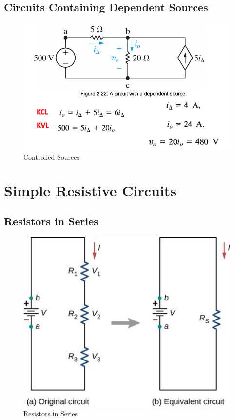 \documentclass[14pt]{memoir}
\begin{document}
\section{Circuits Containing Dependent Sources}

\begin{figure}[H]
\begin{center}
\includegraphics[scale=0.50]{fig/fig02_22.png}
\caption{Controlled Sources}
\label{fig:fig02_22}
\end{center}
\end{figure}


\chapter{Simple Resistive Circuits}

\section{Resistors in Series}

\begin{figure}[H]
\begin{center}
\includegraphics[scale=0.50]{fig/fig_10_12.jpg}
\caption{Resistors in Series}
\label{fig:10_12}
\end{center}
\end{figure}
\end{document}

